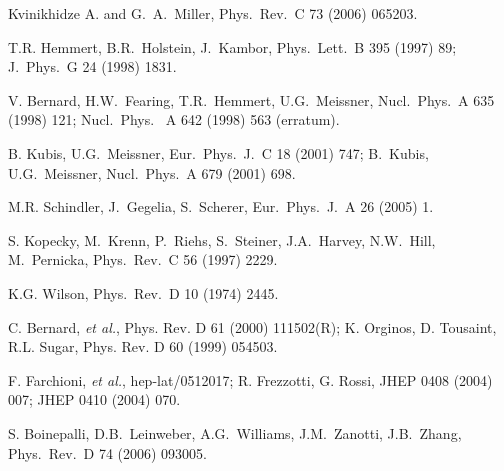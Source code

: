\begin{thebibliography}{PPV06}
  Kvinikhidze A. and G.~A.~Miller,
  Phys.\ Rev.\ C  73 (2006) 065203.

T.R. Hemmert, B.R.~Holstein, J.~Kambor,
Phys.\ Lett.\ B  395 (1997) 89;
  J.\ Phys.\ G  24 (1998) 1831.

  V. Bernard, H.W.~Fearing, T.R.~Hemmert, U.G.~Meissner,
  Nucl.\ Phys.\ A  635 (1998) 121; Nucl.\ Phys. \ A  642 (1998) 563 (erratum).

  B. Kubis, U.G.~Meissner,
  Eur.\ Phys.\ J.\ C  18 (2001) 747; 
  B.~Kubis, U.G.~Meissner,
  Nucl.\ Phys.\ A  679 (2001) 698.

  M.R. Schindler, J.~Gegelia, S.~Scherer,
  Eur.\ Phys.\ J.\ A  26 (2005) 1.

S. Kopecky, M.~Krenn, P.~Riehs, S.~Steiner, J.A.~Harvey, N.W.~Hill, M.~Pernicka,
  Phys.\ Rev.\  C  56 (1997) 2229.

  K.G. Wilson,
  Phys.\ Rev.\ D  10 (1974) 2445.

C. Bernard, {\it et al.}, Phys. Rev. D  61 (2000) 111502(R); 
K. Orginos, D. Tousaint, R.L. Sugar, Phys. Rev. D  60 (1999) 054503.

F. Farchioni, {\it et al.}, hep-lat/0512017; 
R. Frezzotti, G. Rossi, JHEP 0408  (2004) 007; JHEP 0410 (2004) 070.

S. Boinepalli, D.B.~Leinweber, A.G.~Williams, J.M.~Zanotti, J.B.~Zhang,
  Phys.\ Rev.\ D  74 (2006) 093005. 
  

\end{thebibliography}
